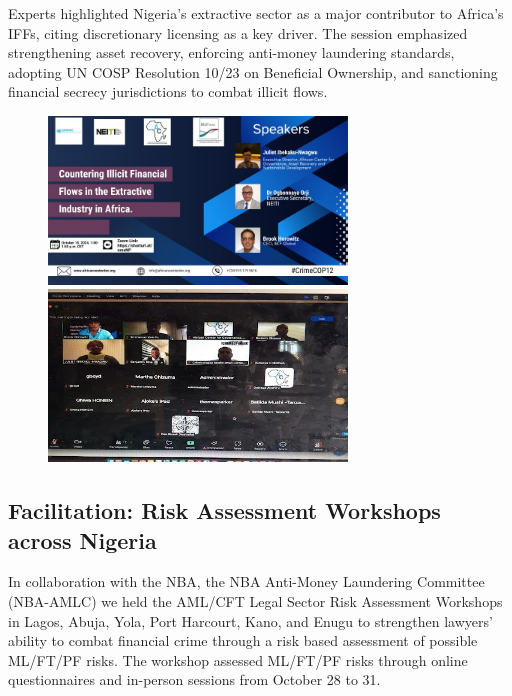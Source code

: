 \documentclass[
  letterpaper,
  DIV=11,
  numbers=noendperiod]{scrreprt}
\begin{document}
Experts highlighted Nigeria's extractive sector as a major contributor
to Africa's IFFs, citing discretionary licensing as a key driver. The
session emphasized strengthening asset recovery, enforcing anti-money
laundering standards, adopting UN COSP Resolution 10/23 on Beneficial
Ownership, and sanctioning financial secrecy jurisdictions to combat
illicit flows.

\begin{figure}

\begin{minipage}{0.50\linewidth}
\includegraphics[width=3.125in,height=\textheight,keepaspectratio]{images/strengthen/13_0_iff.png}\end{minipage}%
%
\begin{minipage}{0.50\linewidth}
\includegraphics[width=3.125in,height=\textheight,keepaspectratio]{images/strengthen/13_1_iff.png}\end{minipage}%

\end{figure}%

\subsection{Facilitation: Risk Assessment Workshops across
Nigeria}\label{facilitation-risk-assessment-workshops-across-nigeria}

In collaboration with the NBA, the NBA Anti-Money Laundering Committee
(NBA-AMLC) we held the AML/CFT Legal Sector Risk Assessment Workshops in
Lagos, Abuja, Yola, Port Harcourt, Kano, and Enugu to strengthen
lawyers' ability to combat financial crime through a risk based
assessment of possible ML/FT/PF risks. The workshop assessed ML/FT/PF
risks through online questionnaires and in-person sessions from October
28 to 31.
\end{document}
